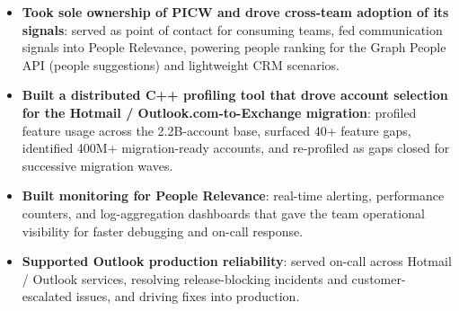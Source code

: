 \documentclass{resume}
\begin{document}
\begin{itemize}
  \item \textbf{Took sole ownership of PICW and drove cross-team adoption of its signals}: served as point of contact for consuming teams, fed communication signals into People Relevance, powering people ranking for the Graph People API (people suggestions) and lightweight CRM scenarios.
  \item \textbf{Built a distributed C++ profiling tool that drove account selection for the Hotmail / Outlook.com-to-Exchange migration}: profiled feature usage across the 2.2B-account base, surfaced 40+ feature gaps, identified 400M+ migration-ready accounts, and re-profiled as gaps closed for successive migration waves.
  \item \textbf{Built monitoring for People Relevance}: real-time alerting, performance counters, and log-aggregation dashboards that gave the team operational visibility for faster debugging and on-call response.
  \item \textbf{Supported Outlook production reliability}: served on-call across Hotmail / Outlook services, resolving release-blocking incidents and customer-escalated issues, and driving fixes into production.
\end{itemize}
\end{document}
